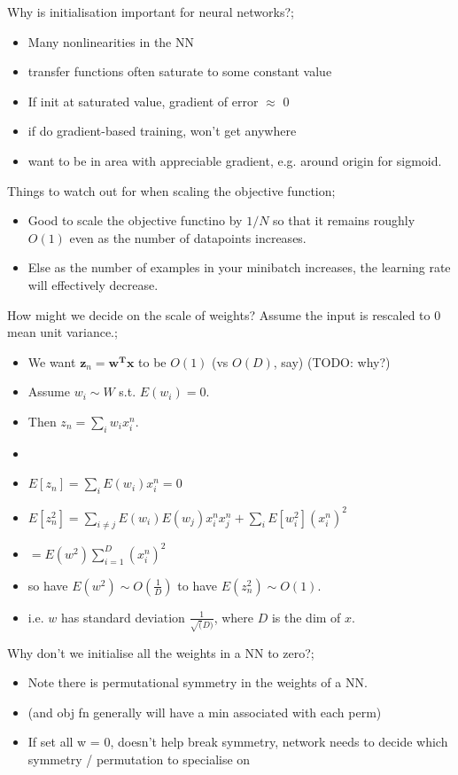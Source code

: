 \documentclass{article}
\begin{document}
Why is initialisation important for neural networks?; \begin{itemize}
    \item Many nonlinearities in the NN
    \item transfer functions often saturate to some constant value
    \item If init at saturated value, gradient of error $\approx$ 0
    \item if do gradient-based training, won't get anywhere
    \item want to be in area with appreciable gradient, e.g. around origin for sigmoid.
\end{itemize}

Things to watch out for when scaling the objective function; \begin{itemize}
    \item Good to scale the objective functino by $1/N$ so that it remains roughly $O(1)$ even as the number of datapoints increases.
    \item Else as the number of examples in your minibatch increases, the learning rate will effectively decrease.
\end{itemize}

How might we decide on the scale of weights? Assume the input is rescaled to 0 mean unit variance.; \begin{itemize}
    \item We want $\mathbf{z}_n = \mathbf{w^Tx}$ to be $O(1)$ (vs $O(D)$, say) (TODO: why?)
    \item Assume $w_i \sim W$ s.t. $E(w_i) = 0$.
    \item Then $z_n = \sum_i w_i x^n_i$. 
    \item 
    \item $E[z_n] = \sum_i E(w_i)x_i^n = 0$
    \item $E[z_n^2] = \sum_{i\ne j} E(w_i)E(w_j)x_i^nx_j^n + \sum_i E[w_i^2](x_i^n)^2$
    \item $=E(w^2)\sum_{i=1}^D(x_i^n)^2$
    \item so have $E(w^2) \sim O(\frac{1}{D})$ to have $E(z_n^2)\sim O(1)$.
    \item i.e. $w$ has standard deviation $\frac{1}{\sqrt(D)}$, where $D$ is the dim of $x$.
\end{itemize}

Why don't we initialise all the weights in a NN to zero?; \begin{itemize}
    \item Note there is permutational symmetry in the weights of a NN.
    \item (and obj fn generally will have a min associated with each perm)
    \item If set all w = 0, doesn't help break symmetry, network needs to decide which symmetry / permutation to specialise on
\end{itemize}
\end{document}
